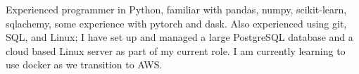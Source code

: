 \documentclass[a4paper]{article}
\begin{document}
Experienced programmer in Python, familiar with pandas, numpy, scikit-learn, sqlachemy, some experience with pytorch and dask. Also experienced using git, SQL, and Linux; I have set up and managed a large PostgreSQL database and a cloud based Linux server as part of my current role. I am currently learning to use docker as we transition to AWS.

%
%
%
%
%
%
%
%
\end{document}
